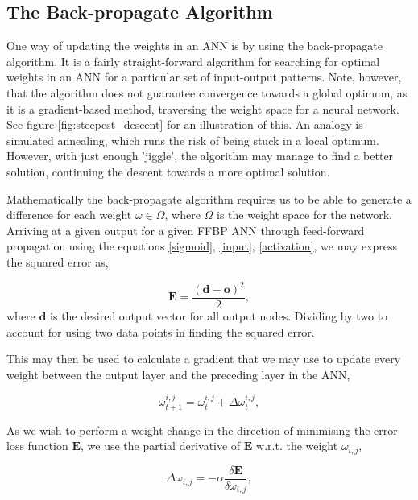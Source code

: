 \subsection{The Back-propagate Algorithm}\label{BP}

One way of updating the weights in an ANN is by using the back-propagate algorithm. It is a fairly straight-forward algorithm for searching for optimal weights in an ANN for a particular set of input-output patterns. Note, however, that the algorithm does not guarantee convergence towards a global optimum, as it is a gradient-based method, traversing the weight space for a neural network. See figure \ref{fig:steepest_descent} for an illustration of this. An analogy is simulated annealing, which runs the risk of being stuck in a local optimum. However, with just enough 'jiggle', the algorithm may manage to find a better solution, continuing the descent towards a more optimal solution.

Mathematically the back-propagate algorithm requires us to be able to generate a difference for each weight $\omega \in \Omega$, where $\Omega$ is the weight space for the network. Arriving at a given output for a given FFBP ANN through feed-forward propagation using the equations \eqref{sigmoid}, \eqref{input}, \eqref{activation}, we may express the squared error as,

\begin{equation}
    \textbf{E} = \frac{(\textbf{d} - \textbf{o})^2}{2},
\end{equation}
where $\textbf{d}$ is the desired output vector for all output nodes. Dividing by two to account for using two data points in finding the squared error.

This may then be used to calculate a gradient that we may use to update every weight between the output layer and the preceding layer in the ANN,

\begin{equation}\label{weight_update}
    \omega_{t+1}^{i,j} = \omega_{t}^{i,j} + \Delta \omega_{t}^{i,j},
\end{equation}

As we wish to perform a weight change in the direction of minimising the error loss function $\textbf{E}$, we use the partial derivative of $\textbf{E}$ w.r.t. the weight $\omega_{i,j}$,

\begin{equation}
    \Delta \omega_{i,j} = -\alpha \frac{\delta \textbf{E}}{\delta \omega_{i,j}},
\end{equation}

